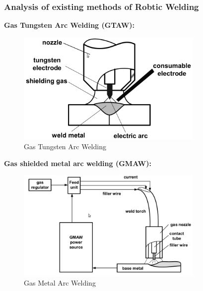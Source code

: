 \subsubsection{Analysis of existing methods of Robtic Welding}
\textbf{Gas Tungsten Arc Welding (GTAW):}
\begin{figure}[htbp] %
 \centering
   \includegraphics[width=9cm]{images/GTAW.png}
   \caption[Gas Tungsten Arc Welding]
   {Gas Tungsten Arc Welding \footnotemark[\value{footnote}]}  
\label{fig:img2}
\end{figure}
\newpage
\textbf{Gas shielded metal arc welding (GMAW):}

\begin{figure}[htbp] %
 \centering
   \includegraphics[width=9cm]{images/GMAW.png}
   \caption[Gas Metal Arc Welding]
   {Gas Metal Arc Welding \footnotemark[\value{footnote}]}  
\label{fig:img3}
\end{figure}

